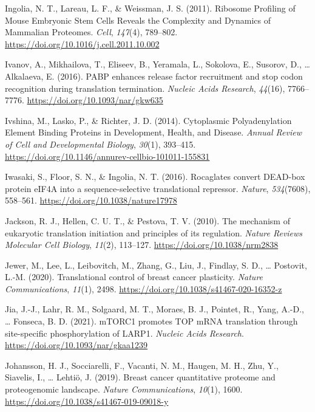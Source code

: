 \documentclass[12pt,openany]{book}
\begin{document}
\hypertarget{ref-Ingolia2011}{}
Ingolia, N. T., Lareau, L. F., \& Weissman, J. S. (2011). Ribosome
Profiling of Mouse Embryonic Stem Cells Reveals the Complexity and
Dynamics of Mammalian Proteomes. \emph{Cell}, \emph{147}(4), 789--802.
\url{https://doi.org/10.1016/j.cell.2011.10.002}

\hypertarget{ref-Ivanov2016}{}
Ivanov, A., Mikhailova, T., Eliseev, B., Yeramala, L., Sokolova, E.,
Susorov, D., \ldots{} Alkalaeva, E. (2016). PABP enhances release factor
recruitment and stop codon recognition during translation termination.
\emph{Nucleic Acids Research}, \emph{44}(16), 7766--7776.
\url{https://doi.org/10.1093/nar/gkw635}

\hypertarget{ref-Ivshina2014}{}
Ivshina, M., Lasko, P., \& Richter, J. D. (2014). Cytoplasmic
Polyadenylation Element Binding Proteins in Development, Health, and
Disease. \emph{Annual Review of Cell and Developmental Biology},
\emph{30}(1), 393--415.
\url{https://doi.org/10.1146/annurev-cellbio-101011-155831}

\hypertarget{ref-Iwasaki2016}{}
Iwasaki, S., Floor, S. N., \& Ingolia, N. T. (2016). Rocaglates convert
DEAD-box protein eIF4A into a sequence-selective translational
repressor. \emph{Nature}, \emph{534}(7608), 558--561.
\url{https://doi.org/10.1038/nature17978}

\hypertarget{ref-Jackson2010}{}
Jackson, R. J., Hellen, C. U. T., \& Pestova, T. V. (2010). The
mechanism of eukaryotic translation initiation and principles of its
regulation. \emph{Nature Reviews Molecular Cell Biology}, \emph{11}(2),
113--127. \url{https://doi.org/10.1038/nrm2838}

\hypertarget{ref-Jewer2020}{}
Jewer, M., Lee, L., Leibovitch, M., Zhang, G., Liu, J., Findlay, S. D.,
\ldots{} Postovit, L.-M. (2020). Translational control of breast cancer
plasticity. \emph{Nature Communications}, \emph{11}(1), 2498.
\url{https://doi.org/10.1038/s41467-020-16352-z}

\hypertarget{ref-Jia2021}{}
Jia, J.-J., Lahr, R. M., Solgaard, M. T., Moraes, B. J., Pointet, R.,
Yang, A.-D., \ldots{} Fonseca, B. D. (2021). mTORC1 promotes TOP mRNA
translation through site-specific phosphorylation of LARP1.
\emph{Nucleic Acids Research}.
\url{https://doi.org/10.1093/nar/gkaa1239}

\hypertarget{ref-Johansson2019}{}
Johansson, H. J., Socciarelli, F., Vacanti, N. M., Haugen, M. H., Zhu,
Y., Siavelis, I., \ldots{} Lehtiö, J. (2019). Breast cancer quantitative
proteome and proteogenomic landscape. \emph{Nature Communications},
\emph{10}(1), 1600. \url{https://doi.org/10.1038/s41467-019-09018-y}
\end{document}
